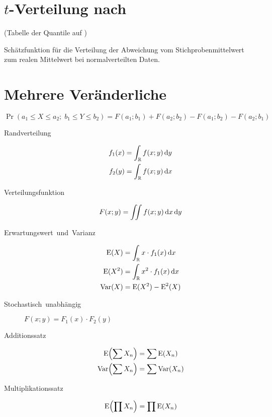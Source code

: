 \section[t-Verteilung nach \protect\noun{Student}]{$t$-Verteilung nach \protect{}}

(Tabelle der Quantile auf )

Schätzfunktion für die Verteilung der Abweichung vom Stichprobenmittelwert zum realen Mittelwert bei normalverteilten Daten.


\section{Mehrere Veränderliche}

\[ \Pr(a_1 \leq X \leq a_2;\; b_1 \leq Y \leq b_2) = F(a_1; b_1) + F(a_2; b_2) - F(a_1; b_2) - F(a_2; b_1) \]

\begin{description}
  \item [{Randverteilung}] 
	\begin{align*}
	  f_{1}(x) & =\int_\mathbb{R} f(x;y)\,\mathrm{d} y\\
	  f_{2}(y) & =\int_\mathbb{R} f(x;y)\,\mathrm{d} x
	\end{align*}
  \item [{Verteilungsfunktion}] 
	\[ F(x;y)=\int\kern-5pt\int f(x;y)\,\mathrm{d} x \,\mathrm{d} y \]
  \item [{Erwartungswert~und~Varianz}] 
	\begin{align*}
	  \operatorname{E}(X)     & =\int_\mathbb{R} x\cdot f_1(x)\,\mathrm{d} x\\
	  \operatorname{E}(X^{2}) & =\int_\mathbb{R} x^2 \cdot f_1(x)\,\mathrm{d} x\\
	  \operatorname{Var}(X)   & =\operatorname{E}(X^{2})-\operatorname{E}^2(X)
	\end{align*}
  \item [{Stochastisch~unabhängig}] 
	$F(x;y)=F_{1}(x)\cdot F_{2}(y)$
  \item [{Additionssatz}] 
	\begin{align*}
	  \operatorname{E}\Bigl(\sum X_n\Bigr)   & =\sum\operatorname{E}(X_n)\\
	  \operatorname{Var}\Bigl(\sum X_n\Bigr) & =\sum\operatorname{Var}(X_n)
	\end{align*}
  \item [{Multiplikationssatz}] 
	\[ \operatorname{E}\Bigl(\prod X_n\Bigr) = \prod\operatorname{E}(X_n) \]
\end{description}

